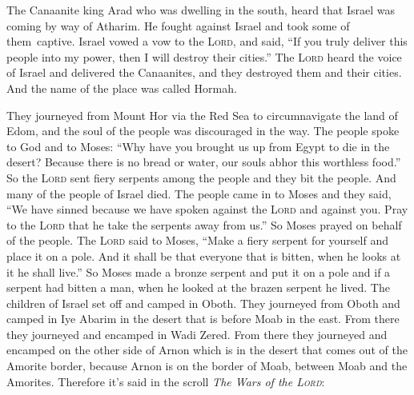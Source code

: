 
\begin{inparaenum}
     The Canaanite king Arad who was dwelling in the south, heard that Israel was coming by way of Atharim. He fought against Israel and took some of them\understood\ captive.%
     Israel vowed a vow to the \textsc{Lord}, and said, ``If you truly deliver this people into my power, then I will destroy their cities.''%
     The \textsc{Lord} heard the voice of Israel and delivered the Canaanites, and they destroyed them and their cities. And the name of the place was called Hormah.%
    
     They journeyed from Mount Hor via the Red Sea to circumnavigate the land of Edom, and the soul of the people was discouraged in the way.%
     The people spoke to God and to Moses: ``Why have you brought us up from Egypt to die in the desert? Because there is no bread or water, our souls abhor this worthless food.''%
     So the \textsc{Lord} sent fiery serpents among the people and they bit the people. And many of the people of Israel died.%
     The people came in to Moses and they said, ``We have sinned because we have spoken against the \textsc{Lord} and against you. Pray to the \textsc{Lord} that he take the serpents away from us.'' So Moses prayed on behalf of the people.%
     The \textsc{Lord} said to Moses, ``Make a fiery serpent for yourself and place it on a pole. And it shall be that everyone that is bitten, when he looks at it he shall live.''%
     So Moses made a bronze serpent and put it on a pole and if a serpent had bitten a man, when he looked at the brazen serpent he lived.%
     The children of Israel set off and camped in Oboth.%
     They journeyed from Oboth and camped in Iye Abarim in the desert that is before Moab in the east.%
     From there they journeyed and encamped in Wadi Zered.%
     From there they journeyed and encamped on the other side of Arnon which is in the desert that comes out of the Amorite border, because Arnon is on the border of Moab, between Moab and the Amorites.%
     Therefore it's said in the scroll \textit{The Wars of the \textsc{Lord}}:\smallskip%
    

\end{inparaenum}
